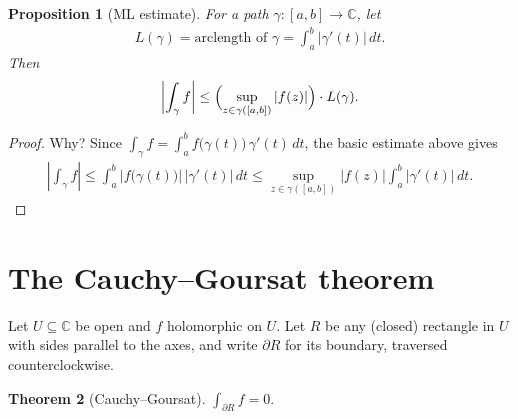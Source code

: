 \documentclass[11pt]{article}
\theoremstyle{plain}
\newtheorem{theorem}{Theorem}[section]
\newtheorem{proposition}[theorem]{Proposition}
\theoremstyle{definition}
\theoremstyle{remark}
\numberwithin{equation}{section}
\newcommand{\be}{\begin{eqnarray}}
\newcommand{\ee}{\end{eqnarray}}
\newcommand{\C}{\mathbb{C}}
\begin{document}
\begin{proposition}[ML estimate]
\label{prop:ML}
For a path $\gamma\colon[a,b]\to\C$, let
\be
 L(\gamma)=\text{arclength of }\gamma=\int_a^b|\gamma'(t)|\,dt.
\ee
Then
\be
 \left|\int_\gamma f\right|\leq\Bigl(\sup_{z\in\gamma([a,b])}|f(z)|\Bigr)\cdot L(\gamma).
\ee
\end{proposition}

\begin{proof}
Why? Since $\int_\gamma f=\int_a^bf\bigl(\gamma(t)\bigr)\,\gamma'(t)\,dt$, the
basic estimate above gives
\be
 \left|\int_\gamma f\right|\leq\int_a^b\bigl|f\bigl(\gamma(t)\bigr)\bigr|\,|\gamma'(t)|\,dt
 \leq\sup_{z\in\gamma([a,b])}|f(z)|\int_a^b|\gamma'(t)|\,dt.
\ee
\end{proof}

\section{The Cauchy--Goursat theorem}
Let $U\subseteq\C$ be open and $f$ holomorphic on $U$. Let $R$ be any
(closed) rectangle in $U$ with sides parallel to the axes, and write
$\partial R$ for its boundary, traversed counterclockwise.

\begin{center}
\end{center}

\begin{theorem}[Cauchy--Goursat]
\label{thm:goursat}
$\displaystyle\int_{\partial R}f=0.$
\end{theorem}
\end{document}
